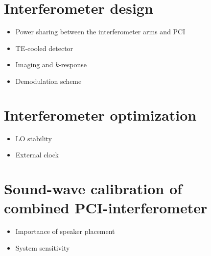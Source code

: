 \section{Interferometer design}
\begin{itemize}
  \item Power sharing between the interferometer arms and PCI
  \item TE-cooled detector
  \item Imaging and $k$-response
  \item Demodulation scheme
\end{itemize}

\section{Interferometer optimization}
\begin{itemize}
  \item LO stability
  \item External clock
\end{itemize}

\section{Sound-wave calibration of combined PCI-interferometer}
\begin{itemize}
  \item Importance of speaker placement
  \item System sensitivity
\end{itemize}





